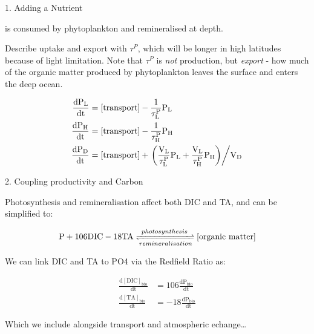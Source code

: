 \begin{frame}{1. Adding a Nutrient}

     is consumed by phytoplankton and remineralised at depth. 
    
    Describe uptake and export with $\tau^P$, which will be longer in high latitudes because of light limitation. Note that $\tau^P$ is \textit{not} production, but \textit{export} - how much of the organic matter produced by phytoplankton leaves the surface and enters the deep ocean.

    \begin{align*}
        \mathrm{\frac{\mathrm{d}P_L}{\mathrm{d}t}} &= \mathrm{[\mathrm{transport}] - \frac{1}{\tau^P_L} P_L} \\
        \mathrm{\frac{\mathrm{d}P_H}{\mathrm{d}t}} &= \mathrm{[\mathrm{transport}] - \frac{1}{\tau^P_H} P_H} \\
        \mathrm{\frac{\mathrm{d}P_D}{\mathrm{d}t}} &= \mathrm{[\mathrm{transport}] + \left. \left( \frac{V_L}{\tau^P_L} P_L + \frac{V_L}{\tau^P_H} P_H \right) \middle/ V_D \right.}
    \end{align*}

\end{frame}

\begin{frame}{2. Coupling productivity and Carbon}

    Photosynthesis and remineralisation affect both DIC and TA, and can be simplified to:

    $$
    \mathrm{P + 106 DIC - 18 TA \xrightleftharpoons[remineralisation]{photosynthesis} [organic~matter]}
    $$

    We can link DIC and TA to PO4 via the Redfield Ratio as:

    \begin{align*}
        \mathrm{\frac{d[DIC]_{bio}}{dt}} &= \mathrm{106 \frac{dP_{bio}}{dt}} \\
        \mathrm{\frac{d[TA]_{bio}}{dt}} &= \mathrm{-18 \frac{dP_{bio}}{dt}}
    \end{align*}

    Which we include alongside transport and atmospheric echange\dots

\end{frame}

